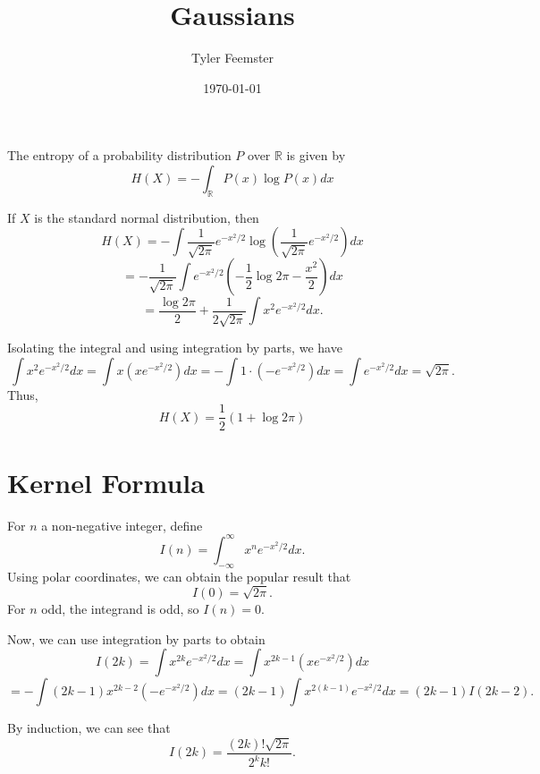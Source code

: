 \documentclass[12pt]{article}
\title{Gaussians}
\author{Tyler Feemster}
\date{\today}
\newcommand{\R}{\mathbb{R}}
\begin{document}
\maketitle

The entropy of a probability distribution $P$ over $\R$ is given by
$$H(X) = -\int_{\R}P(x)\log P(x) dx$$ 

If $X$ is the standard normal distribution, then
$$H(X) = -\int \frac{1}{\sqrt{2\pi}}e^{-x^2/2}\log\left(\frac{1}{\sqrt{2\pi}}e^{-x^2/2}\right)dx$$
$$= -\frac{1}{\sqrt{2\pi}}\int e^{-x^2/2}\left(-\frac{1}{2}\log 2\pi - \frac{x^2}{2}\right)dx$$
$$= \frac{\log 2\pi}{2} + \frac{1}{2\sqrt{2\pi}}\int x^2 e^{-x^2/2}dx.$$

Isolating the integral and using integration by parts, we have
$$\int x^2 e^{-x^2/2}dx = \int x (x e^{-x^2/2})dx = -\int 1\cdot (-e^{-x^2/2})dx = \int e^{-x^2/2} dx = \sqrt{2\pi}.$$
Thus,
$$H(X) = \frac{1}{2}(1+\log 2\pi)$$

\section*{Kernel Formula}

For $n$ a non-negative integer, define 
$$I(n) = \int_{-\infty}^{\infty}x^n e^{-x^2/2} dx.$$
Using polar coordinates, we can obtain the popular result that
$$I(0) = \sqrt{2\pi}.$$
For $n$ odd, the integrand is odd, so $I(n) = 0$.

Now, we can use integration by parts to obtain
$$I(2k) = \int x^{2k} e^{-x^2/2} dx = \int x^{2k-1}(xe^{-x^2/2}) dx$$
$$= - \int (2k-1)x^{2k-2}(-e^{-x^2/2})dx = (2k-1)\int x^{2(k-1)}e^{-x^2/2}dx = (2k-1)I(2k-2).$$

By induction, we can see that
$$I(2k) = \frac{(2k)!\sqrt{2\pi}}{2^k k!}.$$
\end{document}
